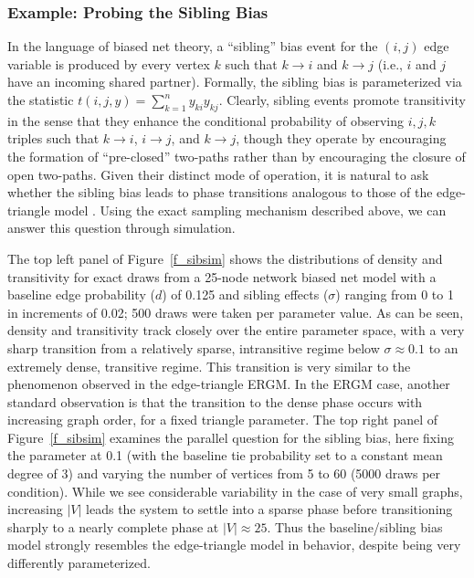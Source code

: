 \documentclass[11pt]{article}
\begin{document}
\subsubsection{Example: Probing the Sibling Bias}

In the language of biased net theory, a ``sibling'' bias event for the $(i,j)$ edge variable is produced by every vertex $k$ such that $k \to i$ and $k \to j$ (i.e., $i$ and $j$ have an incoming shared partner).  Formally, the sibling bias is parameterized via the statistic $t(i,j,y)=\sum_{k=1}^n y_{ki}y_{kj}$.  Clearly, sibling events promote transitivity in the sense that they enhance the conditional probability of observing $i,j,k$ triples such that $k \to i$, $i\to j$, and $k \to j$, though they operate by encouraging the formation of ``pre-closed'' two-paths rather than by encouraging the closure of open two-paths.  Given their distinct mode of operation, it is natural to ask whether the sibling bias leads to phase transitions analogous to those of the edge-triangle model \citep{strauss:siam:1986}.  Using the exact sampling mechanism described above, we can answer this question through simulation.

The top left panel of Figure~\ref{f_sibsim} shows the distributions of density and transitivity for exact draws from a 25-node network biased net model with a baseline edge probability ($d$) of 0.125 and sibling effects ($\sigma$) ranging from 0 to 1 in increments of 0.02; 500 draws were taken per parameter value.  As can be seen, density and transitivity track closely over the entire parameter space, with a very sharp transition from a relatively sparse, intransitive regime below $\sigma \approx 0.1$ to an extremely dense, transitive regime.  This transition is very similar to the phenomenon observed in the edge-triangle ERGM.  In the ERGM case, another standard observation is that the transition to the dense phase occurs with increasing graph order, for a fixed triangle parameter.  The top right panel of Figure~\ref{f_sibsim} examines the parallel question for the sibling bias, here fixing the parameter at 0.1 (with the baseline tie probability set to a constant mean degree of 3) and varying the number of vertices from 5 to 60 (5000 draws per condition).  While we see considerable variability in the case of very small graphs, increasing $|V|$ leads the system to settle into a sparse phase before transitioning sharply to a nearly complete phase at $|V|\approx 25$.  Thus the baseline/sibling bias model strongly resembles the edge-triangle model in behavior, despite being very differently parameterized.
\end{document}
